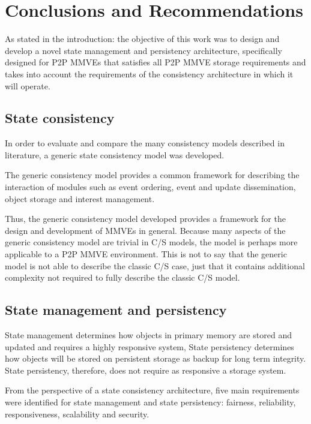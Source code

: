 \chapter{Conclusions and Recommendations}
\label{chp:CONC}

As stated in the introduction: the objective of this work was to design and develop a novel state management and persistency architecture, specifically designed for P2P MMVEs that satisfies all P2P MMVE storage requirements and takes into account the requirements of the consistency architecture in which it will operate.

\section{State consistency}

In order to evaluate and compare the many consistency models described in literature, a generic state consistency model was developed.

The generic consistency model provides a common framework for describing the interaction of modules such as event ordering, event and update dissemination, object storage and interest management.

Thus, the generic consistency model developed provides a framework for the design and development of MMVEs in general. Because many aspects of the generic consistency model are trivial in C/S models, the model is perhaps more applicable to a P2P MMVE environment. This is not to say that the generic model is not able to describe the classic C/S case, just that it contains additional complexity not required to fully describe the classic C/S model.

\section{State management and persistency}

State management determines how objects in primary memory are stored and updated and requires a highly responsive system, State persistency determines how objects will be stored on persistent storage as backup for long term integrity. State persistency, therefore, does not require as responsive a storage system.

From the perspective of a state consistency architecture, five main requirements were identified for state management and state persistency: fairness, reliability, responsiveness, scalability and security.


